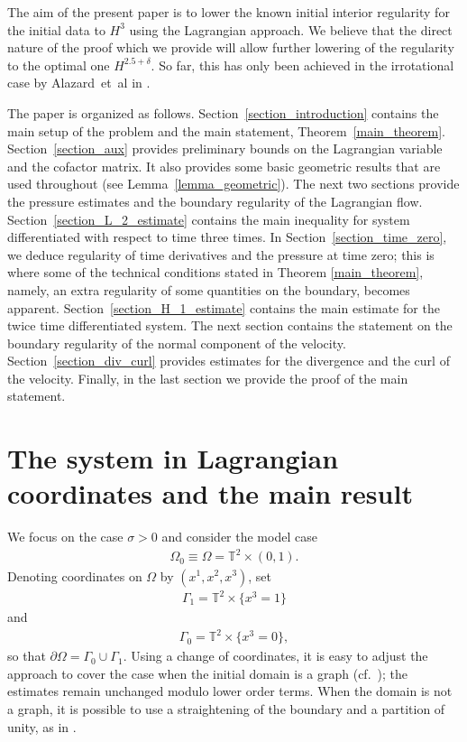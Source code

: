 \documentclass[10pt,reqno]{amsart}
\theoremstyle{plain}
\theoremstyle{definition}
\numberwithin{equation}{section}
\newcommand{\Ga}{\Gamma}
\newcommand{\si}{\sigma}
\newcommand{\Om}{\Omega}
\newcommand{\TT}{\mathbb T}
\begin{document}
The aim of the present paper is to lower the known initial interior 
regularity for the initial data to $H^{3}$ using the Lagrangian
approach. 
We believe that
the direct nature of the proof 
which we provide
will allow further lowering of the
regularity to the optimal one
$H^{2.5+\delta}$.
So far, this has only been achieved in the irrotational case
by Alazard~et~al in \cite{AlazardWaterWaveSurfaceTension}.

The paper is organized as follows. Section~\ref{section_introduction}
contains the main setup of the problem and the main statement,
Theorem~\ref{main_theorem}.
Section~\ref{section_aux} provides preliminary bounds on the Lagrangian variable and the cofactor matrix.
It also provides some basic geometric results that are used throughout (see 
Lemma~\ref{lemma_geometric}).
The next two sections
provide the pressure estimates and the boundary regularity of the Lagrangian flow.
Section~\ref{section_L_2_estimate} contains the main inequality for system differentiated with 
respect to time three times. 
In Section~\ref{section_time_zero}, we deduce regularity of time derivatives and the pressure at time zero; this is where some of the technical conditions stated in Theorem \ref{main_theorem},
namely, an extra regularity of some quantities on the boundary,
becomes apparent.
Section~\ref{section_H_1_estimate}
contains the main estimate for the twice time differentiated system.
The next section contains the statement on the boundary regularity of the normal component of the velocity. 
Section~\ref{section_div_curl} provides estimates for the divergence and the curl
of the velocity. Finally, in the last section we provide the proof of the main statement.

\section{The system in Lagrangian coordinates and the main result\label{section_introduction}}

We focus on the case $\si > 0$ and consider the model case
\begin{gather}
\Om_0 \equiv \Om = \TT^2 \times (0,1).
\nonumber
\end{gather}
Denoting coordinates on $\Om$ by $(x^1, x^2, x^3)$, set
\begin{gather}
\Ga_1 = \TT^2 \times \{x^3 = 1\}
\nonumber
\end{gather}
and
\begin{gather}
\Ga_0 = \TT^2 \times \{x^3 = 0\},
\nonumber
\end{gather}
so that $\partial \Om = \Ga_0 \cup \Ga_1$. 
Using a change of coordinates, it is easy to adjust the approach to cover the case when the
initial domain is a graph
(cf.~\cite{KukavicaTuffahaVicol-3dFreeEuler});
the estimates remain unchanged modulo lower order terms.
When the domain is not a graph,
it is possible to use a straightening of the boundary and a partition
of unity, as in \cite{CoutandShkollerFreeBoundary}.
\end{document}
